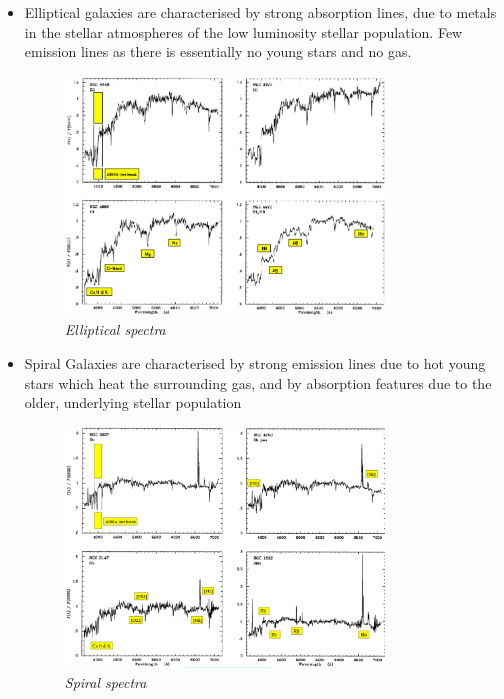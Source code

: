 \documentclass[11pt]{article}
\numberwithin{equation}{section}
\begin{document}
\begin{itemize}
\item Elliptical galaxies are characterised by strong absorption lines, due to metals in the stellar atmospheres of the low luminosity stellar population. Few emission lines as there is essentially no young stars and no gas. 
\begin{figure}[H]
\centering
\includegraphics[width=0.8\textwidth]{Graph6.png}
\caption{\label{fig:2}\emph{Elliptical spectra}}
\end{figure}
\item Spiral Galaxies are characterised by strong emission lines due to hot young stars which heat the surrounding gas, and by absorption features due to the older, underlying stellar population 

\begin{figure}[H]
\centering
\includegraphics[width=0.8\textwidth]{Graph7.png}
\caption{\label{fig:2}\emph{Spiral spectra}}
\end{figure}


\end{itemize}
\end{document}
